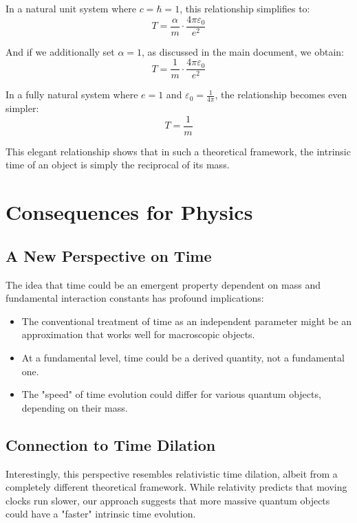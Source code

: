 \documentclass{article}
\begin{document}
	In a natural unit system where $c = \hbar = 1$, this relationship simplifies to:
	\begin{equation}
		T = \frac{\alpha}{m} \cdot \frac{4\pi\varepsilon_0}{e^2}
	\end{equation}
	
	And if we additionally set $\alpha = 1$, as discussed in the main document, we obtain:
	\begin{equation}
		T = \frac{1}{m} \cdot \frac{4\pi\varepsilon_0}{e^2}
	\end{equation}
	
	In a fully natural system where $e = 1$ and $\varepsilon_0 = \frac{1}{4\pi}$, the relationship becomes even simpler:
	\begin{equation}
		T = \frac{1}{m}
	\end{equation}
	
	This elegant relationship shows that in such a theoretical framework, the intrinsic time of an object is simply the reciprocal of its mass.
	
	\section{Consequences for Physics}
	
	\subsection{A New Perspective on Time}
	
	The idea that time could be an emergent property dependent on mass and fundamental interaction constants has profound implications:
	\begin{itemize}
		\item The conventional treatment of time as an independent parameter might be an approximation that works well for macroscopic objects.
		\item At a fundamental level, time could be a derived quantity, not a fundamental one.
		\item The "speed" of time evolution could differ for various quantum objects, depending on their mass.
	\end{itemize}
	
	\subsection{Connection to Time Dilation}
	
	Interestingly, this perspective resembles relativistic time dilation, albeit from a completely different theoretical framework. While relativity predicts that moving clocks run slower, our approach suggests that more massive quantum objects could have a "faster" intrinsic time evolution.
	
\end{document}
